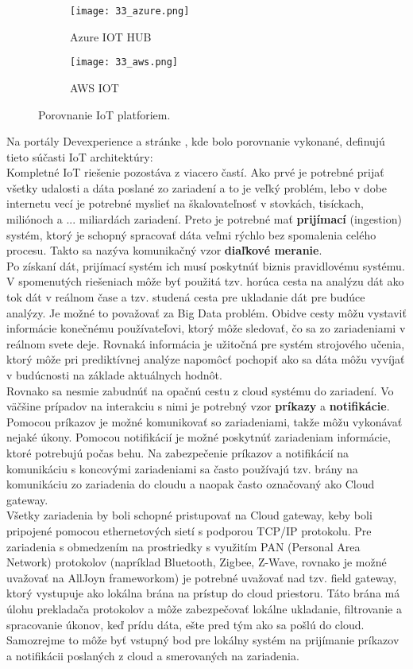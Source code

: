 \begin{figure}[!htbp]
\centering
\begin{subfigure}[b]{0.8\textwidth}
\texttt{[image: 33\_azure.png]}
\caption{Azure IOT HUB \cite{IOT22}}
\label{33_azure}
\end{subfigure}
\begin{subfigure}[b]{0.8\textwidth}
\texttt{[image: 33\_aws.png]}
\caption{AWS IOT \cite{IOT22}}
\label{33_aws}
\end{subfigure}
\caption{Porovnanie IoT platforiem.}
\label{33_aa}
\end{figure}
\indent Na portály Devexperience a stránke \cite{IOT22}, kde bolo porovnanie vykonané, definujú tieto súčasti IoT architektúry: \\
\indent Kompletné IoT riešenie pozostáva z viacero častí. Ako prvé je potrebné prijať všetky udalosti a dáta poslané zo zariadení a to je veľký problém, lebo v dobe internetu vecí je potrebné myslieť na škalovateľnosť v stovkách, tisíckach, miliónoch a ...  miliardách zariadení. Preto je potrebné mať \textbf{prijímací} (ingestion) systém, ktorý je schopný spracovať dáta veľmi rýchlo bez spomalenia celého procesu. Takto sa nazýva komunikačný vzor\textbf{ diaľkové meranie}. \\
\indent Po získaní dát, prijímací systém ich musí poskytnúť biznis pravidlovému systému. V spomenutých riešeniach môže byť použitá tzv. horúca cesta na analýzu dát ako tok dát v reálnom čase a tzv. studená cesta pre ukladanie dát pre budúce analýzy. Je možné to považovať za Big Data problém. Obidve cesty môžu vystaviť informácie konečnému používateľovi, ktorý môže sledovať, čo sa zo zariadeniami v reálnom svete deje. Rovnaká informácia je  užitočná pre systém strojového učenia, ktorý môže pri prediktívnej analýze napomôcť pochopiť ako sa dáta môžu vyvíjať v budúcnosti na základe aktuálnych hodnôt. \\
\indent Rovnako sa nesmie zabudnúť na opačnú cestu z cloud systému do zariadení. Vo väčšine prípadov na interakciu s nimi je potrebný vzor \textbf{príkazy} a \textbf{notifikácie}. Pomocou príkazov je možné komunikovať so zariadeniami, takže môžu vykonávať nejaké úkony. Pomocou notifikácií je možné poskytnúť zariadeniam informácie, ktoré potrebujú počas behu. Na zabezpečenie príkazov a notifikácií na komunikáciu s koncovými zariadeniami sa často používajú tzv. brány na komunikáciu zo zariadenia do cloudu a naopak často označovaný ako Cloud gateway. \\
\indent Všetky zariadenia by boli schopné pristupovať na Cloud gateway, keby boli pripojené pomocou ethernetových sietí s podporou TCP/IP protokolu. Pre zariadenia s obmedzením na prostriedky s využitím PAN (Personal Area Network) protokolov (napríklad Bluetooth, Zigbee, Z-Wave, rovnako je možné uvažovať na AllJoyn frameworkom) je potrebné uvažovať nad tzv. field gateway, ktorý vystupuje ako lokálna brána na prístup do cloud priestoru. Táto brána má úlohu prekladača protokolov a môže zabezpečovať lokálne ukladanie, filtrovanie a spracovanie úkonov, keď prídu dáta, ešte pred tým ako sa pošlú do cloud. Samozrejme to môže byť vstupný bod pre lokálny systém na prijímanie príkazov a notifikácii poslaných z cloud a smerovaných na zariadenia. \cite{IOT22}
